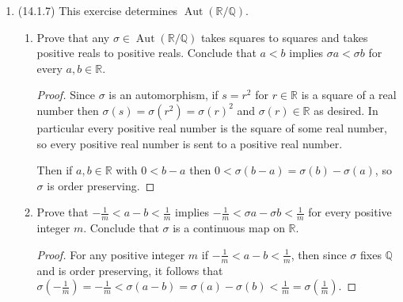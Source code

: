 \documentclass[11pt]{article}
\DeclareMathOperator\Aut{Aut}
\begin{document}
\begin{enumerate}
\begin{enumerate}
\begin{proof}
            Suppose $E/F$ is fixed by each of the generators $\sigma_1,\dots,\sigma_k$ for $G$. It follows that every automorphism $\sigma\in G$ fixes $E/F$ since $\sigma$ may be represented as a finite product (compositions) of the $\sigma_i$, and each of those fix $E/F$.

            Conversely, suppose $G$ fixes $E/F$; it follows immediately that $\sigma_i\in G$ fix $E/F$.
        \end{proof}
    \end{enumerate}
    \item (14.1.7) This exercise determines $\Aut(\mathbb{R}/\mathbb{Q})$. \begin{enumerate}
        \item Prove that any $\sigma\in \Aut(\mathbb{R}/\mathbb{Q})$ takes squares to squares and takes positive reals to positive reals. Conclude that $a<b$ implies $\sigma a < \sigma b$ for every $a,b\in\mathbb{R}$. \begin{proof}
            Since $\sigma$ is an automorphism, if $s = r^2$ for $r\in\mathbb{R}$ is a square of a real number then $\sigma(s) = \sigma(r^2) = \sigma(r)^2$ and $\sigma(r)\in \mathbb{R}$ as desired. In particular every positive real number is the square of some real number, so every positive real number is sent to a positive real number.

            Then if $a,b\in \mathbb{R}$ with $0<b-a$ then $0<\sigma(b-a) = \sigma(b)-\sigma(a)$, so $\sigma$ is order preserving.
        \end{proof}
        \item Prove that $-\frac{1}{m}< a-b <\frac{1}{m}$ implies $-\frac{1}{m}< \sigma a- \sigma b <\frac{1}{m}$ for every positive integer $m$. Conclude that $\sigma$ is a continuous map on $\mathbb{R}$. \begin{proof}
            For any positive integer $m$ if $-\frac{1}{m}< a-b < \frac{1}{m}$, then since $\sigma$ fixes $\mathbb{Q}$ and is order preserving, it follows that $\sigma\left(-\frac{1}{m}\right) = -\frac{1}{m} < \sigma(a-b) = \sigma(a) - \sigma(b) < \frac{1}{m} = \sigma\left(\frac{1}{m}\right)$.


\end{proof}
\end{enumerate}
\end{enumerate}
\end{document}
